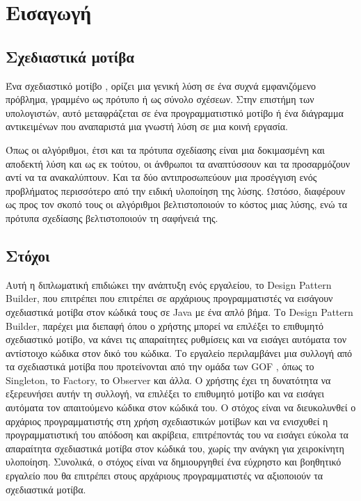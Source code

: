 \chapter{Εισαγωγή}
\label{ch:Introduction}
\section{Σχεδιαστικά μοτίβα}
\label{sec:patterns}
Ένα σχεδιαστικό μοτίβο \cite{GoF}, ορίζει μια γενική λύση σε ένα συχνά εμφανιζόμενο πρόβλημα, γραμμένο
ως πρότυπο ή ως σύνολο σχέσεων. Στην επιστήμη των υπολογιστών, αυτό μεταφράζεται σε ένα
προγραμματιστικό μοτίβο ή ένα διάγραμμα αντικειμένων που αναπαριστά μια 
γνωστή λύση σε μια κοινή εργασία. \par
Όπως οι αλγόριθμοι, έτσι και τα πρότυπα σχεδίασης είναι μια δοκιμασμένη
και αποδεκτή λύση και ως εκ τούτου, οι άνθρωποι τα αναπτύσσουν και 
τα προσαρμόζουν αντί να τα ανακαλύπτουν.
Και τα δύο αντιπροσωπεύουν μια προσέγγιση ενός προβλήματος περισσότερο από 
την ειδική υλοποίηση της λύσης. Ωστόσο, διαφέρουν ως προς τον σκοπό τους 
οι αλγόριθμοι βελτιστοποιούν το κόστος μιας λύσης, 
ενώ τα πρότυπα σχεδίασης βελτιστοποιούν τη σαφήνειά της.
\section{Στόχοι}
\label{sec:Objectives}
Αυτή η διπλωματική επιδιώκει την ανάπτυξη ενός εργαλείου, το Design Pattern Builder, 
που επιτρέπει που επιτρέπει σε αρχάριους προγραμματιστές να εισάγουν 
σχεδιαστικά μοτίβα στον κώδικά τους σε Java με ένα απλό βήμα. 
Το Design Pattern Builder, παρέχει μια διεπαφή όπου ο χρήστης μπορεί να επιλέξει το επιθυμητό 
σχεδιαστικό μοτίβο, να κάνει τις απαραίτητες ρυθμίσεις 
και να εισάγει αυτόματα τον αντίστοιχο κώδικα στον δικό του κώδικα. 
Το εργαλείο περιλαμβάνει μια συλλογή από τα σχεδιαστικά μοτίβα που 
προτείνονται από την ομάδα των GOF \cite{GoF}, 
όπως το Singleton, το Factory, το Observer και άλλα. 
Ο χρήστης έχει τη δυνατότητα να εξερευνήσει αυτήν τη συλλογή, να επιλέξει 
το επιθυμητό μοτίβο και να εισάγει αυτόματα τον απαιτούμενο κώδικα στον κώδικά 
του. Ο στόχος είναι να διευκολυνθεί ο αρχάριος προγραμματιστής στη χρήση 
σχεδιαστικών μοτίβων και να ενισχυθεί η προγραμματιστική του απόδοση και ακρίβεια, 
επιτρέποντάς του να εισάγει εύκολα τα απαραίτητα σχεδιαστικά μοτίβα στον κώδικά 
του, χωρίς την ανάγκη για χειροκίνητη υλοποίηση. 
Συνολικά, ο στόχος είναι να δημιουργηθεί ένα εύχρηστο και βοηθητικό 
εργαλείο που θα επιτρέπει στους αρχάριους προγραμματιστές να αξιοποιούν 
τα σχεδιαστικά μοτίβα.
